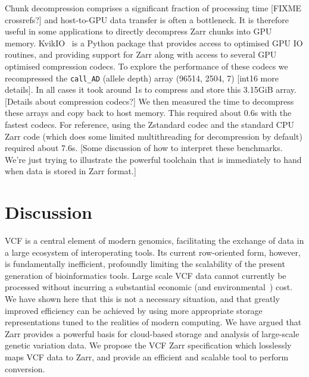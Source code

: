 \documentclass[a4paper,num-refs]{oup-contemporary}
\begin{document}
Chunk decompression comprises a significant fraction of processing
time [FIXME crossrefs?] and host-to-GPU data transfer is
often a bottleneck. It is therefore useful in some applications
to directly decompress Zarr chunks into GPU memory.
KvikIO~\cite{kvikio} is a Python package that provides access to optimised
GPU IO routines, and providing support for Zarr along with
access to several GPU optimised compression codecs.
To explore the performance of these codecs we recompressed
the \texttt{call\_AD} (allele depth) array
(96514, 2504, 7) [int16 more details]. In all cases it took around 1s
to compress and store this 3.15GiB array. [Details about compression codecs?]
We then measured the time to decompress these arrays and
copy back to host memory. This required about 0.6s with the
fastest codecs. For reference, using the Zstandard codec and the
standard CPU Zarr code (which does some limited multithreading for decompression
by default) required about 7.6s. [Some discussion of how to interpret
these benchmarks. We're just trying to illustrate the powerful toolchain
 that is immediately to hand when data is stored in Zarr format.]

\section{Discussion}
VCF is a central element of modern genomics, facilitating
the exchange of data in a large ecosystem of interoperating tools.
Its current row-oriented form, however,
is fundamentally inefficient,
profoundly limiting the scalability of the present generation
of bioinformatics tools. Large scale VCF data cannot
currently be
processed without incurring a substantial economic
(and environmental~\cite{grealey2022carbon}) cost.
We have shown here that this is not a necessary situation,
and that greatly improved efficiency can be achieved by
using more appropriate storage representations tuned
to the realities of modern computing. We have argued that
Zarr provides a powerful basis for cloud-based
storage and analysis of large-scale genetic variation data.
We propose the VCF Zarr specification which losslessly
maps VCF data to Zarr, and provide an efficient and scalable
tool to perform conversion.
\end{document}
